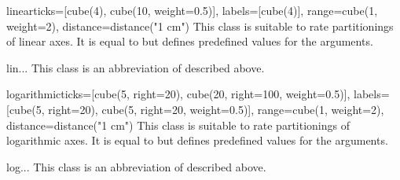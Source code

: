 \begin{classdesc}{linear}{ticks=[cube(4), cube(10, weight=0.5)],
                          labels=[cube(4)],
                          range=cube(1, weight=2),
                          distance=distance("1 cm")}
  This class is suitable to rate partitionings of linear axes. It is
  equal to  but defines predefined values for the
  arguments.
\end{classdesc}

\begin{classdesc}{lin}{...}
  This class is an abbreviation of  described above.
\end{classdesc}

\begin{classdesc}{logarithmic}{ticks=[cube(5, right=20), cube(20, right=100, weight=0.5)],
                               labels=[cube(5, right=20), cube(5, right=20, weight=0.5)],
                               range=cube(1, weight=2),
                               distance=distance("1 cm")}
  This class is suitable to rate partitionings of logarithmic axes. It
  is equal to  but defines predefined values for the
  arguments.
\end{classdesc}

\begin{classdesc}{log}{...}
  This class is an abbreviation of  described above.
\end{classdesc}

